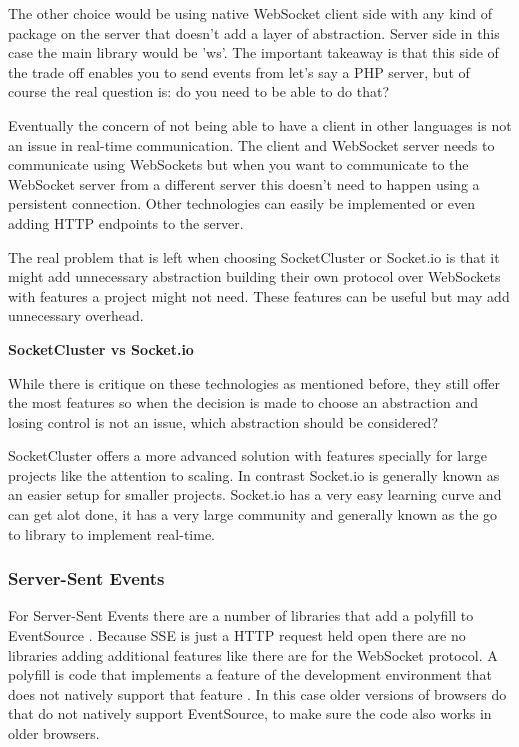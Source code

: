 The other choice would be using native WebSocket client side with any kind of package on the server that doesn't add a layer of abstraction. Server side in this case the main library would be 'ws'. The important takeaway is that this side of the trade off enables you to send events from let's say a PHP server, but of course the real question is: do you need to be able to do that?

Eventually the concern of not being able to have a client in other languages is not an issue in real-time communication. The client and WebSocket server needs to communicate using WebSockets but when you want to communicate to the WebSocket server from a different server this doesn't need to happen using a persistent connection. Other technologies can easily be implemented or even adding HTTP endpoints to the server.

The real problem that is left when choosing SocketCluster or Socket.io is that it might add unnecessary abstraction building their own protocol over WebSockets with features a project might not need. These features can be useful but may add unnecessary overhead.

\textbf{SocketCluster vs Socket.io}

While there is critique on these technologies as mentioned before, they still offer the most features so when the decision is made to choose an abstraction and losing control is not an issue, which abstraction should be considered?

SocketCluster offers a more advanced solution with features specially for large projects like the attention to scaling. In contrast Socket.io is generally known as an easier setup for smaller projects. Socket.io has a very easy learning curve and can get alot done, it has a very large community and generally known as the go to library to implement real-time.

\subsubsection{Server-Sent Events}

For Server-Sent Events there are a number of libraries that add a polyfill to EventSource \cite{mdn-sse}. Because SSE is just a HTTP request held open there are no libraries adding additional features like there are for the WebSocket protocol. A polyfill is code that implements a feature of the development environment that does not natively support that feature \cite{polyfill}. In this case older versions of browsers do that do not natively support EventSource, to make sure the code also works in older browsers.

